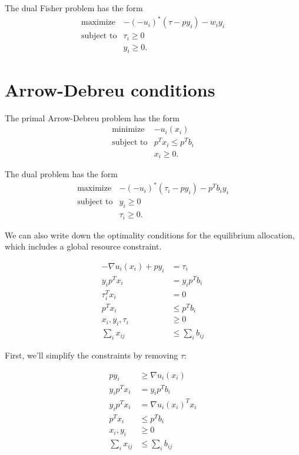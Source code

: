 \documentclass{article}
\begin{document}
The dual Fisher problem has the form
\[
\begin{array}{ll}
\mbox{maximize} & -(-u_i)^*(\tau - p y_i) - w_i y_i\\
\mbox{subject to} & \tau_i \geq 0\\
& y_i \geq 0.
\end{array}
\]

\section{Arrow-Debreu conditions}
The primal Arrow-Debreu problem has the form
\[
\begin{array}{ll}
\mbox{minimize} & - u_i(x_i)\\
\mbox{subject to} & p^T x_i \leq p^T b_i\\
& x_i \geq 0.
\end{array}
\]

The dual problem has the form
\[
\begin{array}{ll}
\mbox{maximize} & -(- u_i)^*(\tau_i - p y_i) - p^T b_i y_i\\
\mbox{subject to} & y_i \geq 0\\
& \tau_i \geq 0.
\end{array}
\]

We can also write down the optimality conditions for the equilibrium allocation,
which includes a global resource constraint.

\begin{align*}
-\nabla u_i(x_i) + p y_i &= \tau_i\\
y_i p^T x_i &= y_i p^T b_i \\
\tau_i^T x_i &= 0\\
p^T x_i &\leq p^T b_i\\
x_i, y_i, \tau_i &\geq 0\\
\sum_{i} x_{ij} &\leq \sum_{i} b_{ij}
\end{align*}

First, we'll simplify the constraints by removing $\tau$:

\begin{align*}
p y_i &\geq \nabla u_i(x_i) \\
y_i p^T x_i &= y_i p^T b_i \\
y_i p^T x_i &= \nabla u_i(x_i)^T x_i\\
p^T x_i &\leq p^T b_i\\
x_i, y_i &\geq 0\\
\sum_{i} x_{ij} &\leq \sum_{i} b_{ij}
\end{align*}
\end{document}
